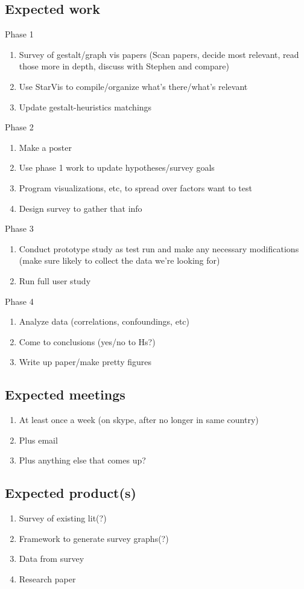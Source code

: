 \documentclass[12pt, twocolumn]{article}
\begin{document}
\subsection{Expected work}
Phase 1
\begin{enumerate}
	\item Survey of gestalt/graph vis papers (Scan papers, decide most relevant, read those more in depth, discuss with Stephen and compare)
	\item Use StarVis to compile/organize what's there/what's relevant
	\item Update gestalt-heuristics matchings
\end{enumerate}
Phase 2
\begin{enumerate}
	\item Make a poster
	\item Use phase 1 work to update hypotheses/survey goals
	\item Program visualizations, etc, to spread over factors want to test
	\item Design survey to gather that info
\end{enumerate}
Phase 3
\begin{enumerate}
	\item Conduct prototype study as test run and make any necessary modifications (make sure likely to collect the data we're looking for)
	\item Run full user study
\end{enumerate}
Phase 4
\begin{enumerate}
	\item Analyze data (correlations, confoundings, etc)
	\item Come to conclusions (yes/no to Hs?)
	\item Write up paper/make pretty figures
\end{enumerate}
\subsection{Expected meetings}
\begin{enumerate}
	\item At least once a week (on skype, after no longer in same country)
	\item Plus email
	\item Plus anything else that comes up?
\end{enumerate}
\subsection{Expected product(s)}
\begin{enumerate}
	\item Survey of existing lit(?)
	\item Framework to generate survey graphs(?)
	\item Data from survey
	\item Research paper
\end{enumerate}
\end{document}

